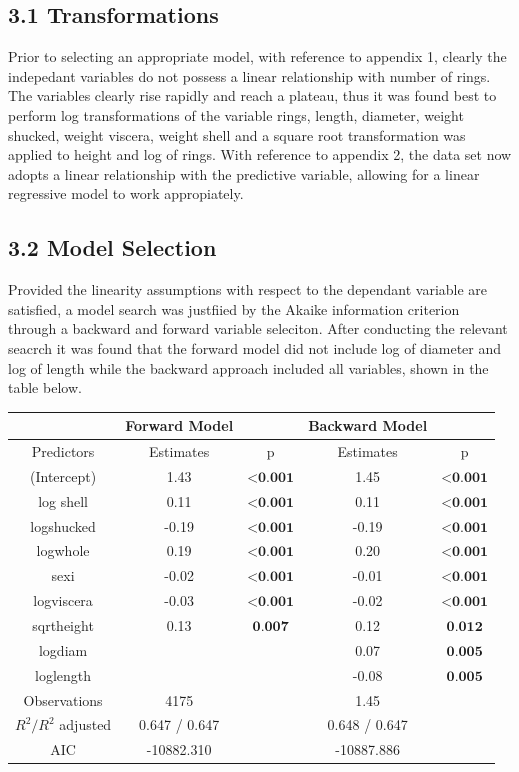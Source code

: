 \documentclass[letterpaper,9pt,twocolumn,twoside,]{pinp}
\begin{document}
\subsection{3.1 Transformations}\label{transformations}

Prior to selecting an appropriate model, with reference to appendix 1,
clearly the indepedant variables do not possess a linear relationship
with number of rings. The variables clearly rise rapidly and reach a
plateau, thus it was found best to perform log transformations of the
variable rings, length, diameter, weight shucked, weight viscera, weight
shell and a square root transformation was applied to height and log of
rings. With reference to appendix 2, the data set now adopts a linear
relationship with the predictive variable, allowing for a linear
regressive model to work appropiately.

\subsection{3.2 Model Selection}\label{model-selection}

Provided the linearity assumptions with respect to the dependant
variable are satisfied, a model search was justfiied by the Akaike
information criterion through a backward and forward variable seleciton.
After conducting the relevant seacrch it was found that the forward
model did not include log of diameter and log of length while the
backward approach included all variables, shown in the table below.

\begin{center}
\begin{tabular}{c c c c c}
    & Forward Model & & Backward Model & \\
    \hline
    Predictors & Estimates & p & Estimates & p\\
    \hline
    (Intercept) & 1.43 & $\textbf{<0.001}$ & 1.45 & $\textbf{<0.001}$\\
    log shell & 0.11 & $\textbf{<0.001}$ & 0.11 & $\textbf{<0.001}$\\
    logshucked & -0.19 & $\textbf{<0.001}$ & -0.19 & $\textbf{<0.001}$\\
    logwhole & 0.19 & $\textbf{<0.001}$ & 0.20 & $\textbf{<0.001}$\\
    sexi & -0.02 & $\textbf{<0.001}$ & -0.01 & $\textbf{<0.001}$\\
    logviscera & -0.03 & $\textbf{<0.001}$ & -0.02 & $\textbf{<0.001}$\\
    sqrtheight & 0.13 & $\textbf{0.007}$ & 0.12 & $\textbf{0.012}$\\
    logdiam &  & & 0.07 & $\textbf{0.005}$\\
     loglength &  & & -0.08 & $\textbf{0.005}$\\
    \hline
    Observations & 4175 &  & 1.45 & \\
    $R^2/R^2$ adjusted & 0.647 / 0.647 & & 0.648 / 0.647 & \\
    AIC & -10882.310 & & -10887.886 & \\
\end{tabular}
\end{center}
\end{document}
